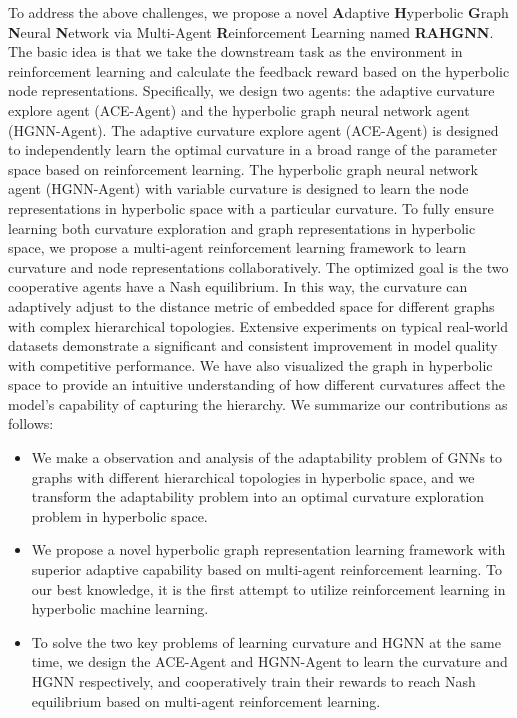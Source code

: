 To address the above challenges, we propose a novel \textbf{A}daptive \textbf{H}yperbolic \textbf{G}raph \textbf{N}eural \textbf{N}etwork via Multi-Agent \textbf{R}einforcement Learning named \textbf{RAHGNN}. 
The basic idea is that we take the downstream task as the environment in reinforcement learning and calculate the feedback reward based on the hyperbolic node representations.
Specifically, we design two agents: the adaptive curvature explore agent (ACE-Agent) and the hyperbolic graph neural network agent (HGNN-Agent). 
The adaptive curvature explore agent (ACE-Agent) is designed to independently learn the optimal curvature in a broad range of the parameter space based on reinforcement learning. 
The hyperbolic graph neural network agent (HGNN-Agent) with variable curvature is designed to learn the node representations in hyperbolic space with a particular curvature. 
To fully ensure learning both curvature exploration and graph representations in hyperbolic space, we propose a multi-agent reinforcement learning framework to learn curvature and node representations collaboratively. 
The optimized goal is the two cooperative agents have a Nash equilibrium. 
In this way, the curvature can adaptively adjust to the distance metric of embedded space for different graphs with complex hierarchical topologies.
Extensive experiments on typical real-world datasets demonstrate a significant and consistent improvement in model quality with competitive performance. 
We have also visualized the graph in hyperbolic space to provide an intuitive understanding of how different curvatures affect the model's capability of capturing the hierarchy. 
We summarize our contributions as follows: 
\vspace{-0.4em}
\begin{itemize}[leftmargin=*]
\item We make a observation and analysis of the adaptability problem of GNNs to graphs with different hierarchical topologies in hyperbolic space, and we transform the adaptability problem into an optimal curvature exploration problem in hyperbolic space. 
\item We propose a novel hyperbolic graph representation learning framework with superior adaptive capability based on multi-agent reinforcement learning. 
To our best knowledge, it is the first attempt to utilize reinforcement learning in hyperbolic machine learning. 
\item To solve the two key problems of learning curvature and HGNN at the same time, we design the ACE-Agent and HGNN-Agent to learn the curvature and HGNN respectively, and cooperatively train their rewards to reach Nash equilibrium based on multi-agent reinforcement learning. 

\end{itemize}
